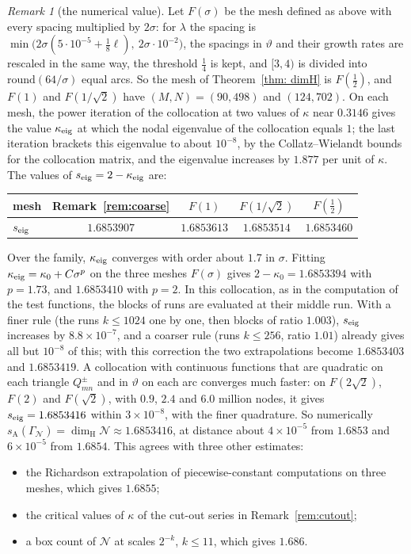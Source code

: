 \documentclass[11pt]{amsart}
\theoremstyle{definition}
\theoremstyle{remark}
\newtheorem{remark}[proposition]{Remark}
\newcommand{\cN}{\mathcal N}
\newcommand{\GN}{\Gamma_{\mathcal N}}
\newcommand{\sA}{s_{\mathrm A}}
\newcommand{\dimH}{\dim_{\mathrm H}}
\begin{document}
\begin{remark}[the numerical value]\label{rem:sAnum}
Let $F(\sigma)$ be the mesh defined as above with every spacing multiplied by $2\sigma$: for $\lambda$ the spacing is $\min\bigl(2\sigma(5\cdot10^{-5}+\frac18\ell),\ 2\sigma\cdot10^{-2}\bigr)$, the spacings in $\vartheta$ and their growth rates are rescaled in the same way, the threshold $\frac14$ is kept, and $[3,4)$ is divided into $\mathrm{round}(64/\sigma)$ equal arcs. So the mesh of Theorem~\ref{thm: dimH} is $F(\frac12)$, and $F(1)$ and $F(1/\sqrt2)$ have $(M,N)=(90,498)$ and $(124,702)$. On each mesh, the power iteration of the collocation at two values of $\kappa$ near $0.3146$ gives the value $\kappa_{\rm eig}$ at which the nodal eigenvalue of the collocation equals $1$; the last iteration brackets this eigenvalue to about $10^{-8}$, by the Collatz--Wielandt bounds for the collocation matrix, and the eigenvalue increases by $1.877$ per unit of $\kappa$. The values of $s_{\rm eig}=2-\kappa_{\rm eig}$ are:
\begin{center}
\begin{tabular}{lcccc}
\toprule
mesh & Remark~\ref{rem:coarse} & $F(1)$ & $F(1/\sqrt2)$ & $F(\frac12)$\\
\midrule
$s_{\rm eig}$ & $1.6853907$ & $1.6853613$ & $1.6853514$ & $1.6853460$\\
\bottomrule
\end{tabular}
\end{center}
Over the family, $\kappa_{\rm eig}$ converges with order about $1.7$ in $\sigma$. Fitting $\kappa_{\rm eig}=\kappa_0+C\sigma^p$ on the three meshes $F(\sigma)$ gives $2-\kappa_0=1.6853394$ with $p=1.73$, and $1.6853410$ with $p=2$. In this collocation, as in the computation of the test functions, the blocks of runs are evaluated at their middle run. With a finer rule (the runs $k\le1024$ one by one, then blocks of ratio $1.003$), $s_{\rm eig}$ increases by $8.8\times10^{-7}$, and a coarser rule (runs $k\le256$, ratio $1.01$) already gives all but $10^{-8}$ of this; with this correction the two extrapolations become $1.6853403$ and $1.6853419$. A collocation with continuous functions that are quadratic on each triangle $Q^\pm_{mn}$ and in $\vartheta$ on each arc converges much faster: on $F(2\sqrt2)$, $F(2)$ and $F(\sqrt2)$, with $0.9$, $2.4$ and $6.0$ million nodes, it gives $s_{\rm eig}=1.6853416$ within $3\times10^{-8}$, with the finer quadrature. So numerically $\sA(\GN)=\dimH\cN\approx1.6853416$, at distance about $4\times10^{-5}$ from $1.6853$ and $6\times10^{-5}$ from $1.6854$. This agrees with three other estimates:
\begin{itemize}
\item the Richardson extrapolation of piecewise-constant computations on three meshes, which gives $1.6855$;
\item the critical values of $\kappa$ of the cut-out series in Remark~\ref{rem:cutout};
\item a box count of $\cN$ at scales $2^{-k}$, $k\le11$, which gives $1.686$.
\end{itemize}


\end{remark}
\end{document}
